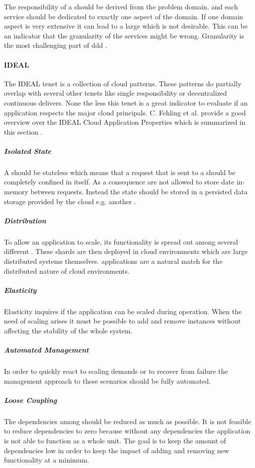 The responsibility of a \ms{} should be derived from the problem domain, and
each service should be dedicated to exactly one aspect of the domain. If one
domain aspect is very extensive it can lead to a large \ms{} which is not
desirable. This can be an indicator that the granularity of the services might
be wrong. Granularity is the most challenging part of \gls{ddd}
\cite{millett2015patterns}.

\paragraph{IDEAL}

The IDEAL tenet is a collection of cloud patterns. These patterns do partially
overlap with several other tenets like single responsibility or decentralized
continuous delivers. None the less this tenet is a great indicator to
evaluate if an application respects the major cloud principals. C. Fehling et
al. provide a good overview over the  IDEAL Cloud Application Properties
which is summarized in this section \cite{fehling2015cloud}.

\subparagraph{Isolated State}
A \ms{} should be stateless which means that a request that is sent to a \ms{}
should be completely confined in itself. As a consequence \mss{} are not allowed
to store date in-memory between requests. Instead the state should be stored in
a persisted data storage provided by the cloud e.g. another \ms{}.

\subparagraph{Distribution}
To allow an application to scale, its functionality is spread out among several
different \mss{}. These shards are then deployed in cloud environments which are
large distributed systems themselves. \msuc{} applications are a natural match
for the distributed nature of cloud environments.

\subparagraph{Elasticity}
Elasticity inquires if the application can be scaled during operation. When
the need of scaling arises it must be possible to add and remove \ms{} instances
without affecting the stability of the whole system.

\subparagraph{Automated Management}
In order to quickly react to scaling demands or to recover from failure the
management approach to these scenarios should be fully automated.

\subparagraph{Loose Coupling}

The dependencies among \mss{} should be reduced as much as possible. It is not
feasible to reduce dependencies to zero because without any dependencies the
application is not able to function as a whole unit. The goal is to keep the
amount of dependencies low in order to keep the impact of adding and removing
new functionality at a minimum.

